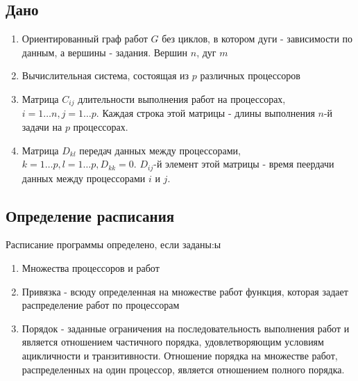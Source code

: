 \subsection*{Дано}
\begin{enumerate}
    \item Ориентированный граф работ $G$ без циклов, в котором дуги - зависимости по данным, а вершины - задания. Вершин $n$, дуг $m$
    \item Вычислительная система, состоящая из $p$ различных процессоров
    \item Матрица $C_{ij}$ длительности выполнения работ на процессорах, $i=1 \dots n, j=1 \dots p$. Каждая строка этой матрицы - длины выполнения $n$-й задачи на $p$ процессорах. 
    \item Матрица $D_{kl}$ передач данных между процессорами, $k=1 \dots p, l = 1 \dots p, D_{kk} = 0$. $D_{ij}$-й элемент этой матрицы - время пеердачи данных между процессорами $i$ и $j$.
\end{enumerate}
\subsection*{Определение расписания}
Расписание программы определено, если заданы:ы
\begin{enumerate}
    \item Множества процессоров и работ
    \item Привязка - всюду определенная на множестве работ функция, которая задает распределение работ по процессорам
    \item Порядок - заданные ограничения на последовательность выполнения работ и является отношением частичного порядка, удовлетворяющим условиям ацикличности и транзитивности. Отношение порядка на множестве работ, распределенных на один процессор, является отношением полного порядка.
\end{enumerate}
